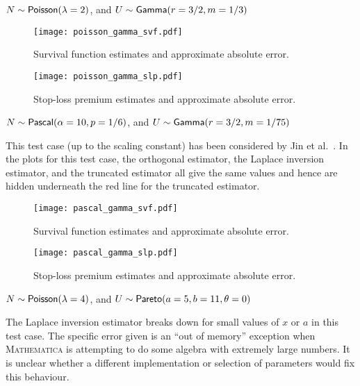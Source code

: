 
\begin{test}
$N\sim\mathsf{Poisson}(\lambda=2)$, and $U\sim\mathsf{Gamma}(r=3/2,m=1/3)$
\end{test}

\begin{figure}[H]
\centering
\texttt{[image: poisson\_gamma\_svf.pdf]}
\caption{Survival function estimates and approximate absolute error.}
\end{figure}

\begin{figure}[H]
\centering
\texttt{[image: poisson\_gamma\_slp.pdf]}
\caption{Stop-loss premium estimates and approximate absolute error.}
\end{figure}


\begin{test}
$N\sim\mathsf{Pascal}(\alpha=10,p=1/6)$, and $U\sim\mathsf{Gamma}(r=3/2,m=1/75)$
\end{test}

This test case (up to the scaling constant) has been considered by Jin et al.\ \cite[Example 3]{JiPrRe16}. In the plots for this test case, the orthogonal estimator, the Laplace inversion estimator, and the truncated estimator all give the same values and hence are hidden underneath the red line for the truncated estimator.

\begin{figure}[H]
\centering
\texttt{[image: pascal\_gamma\_svf.pdf]}
\caption{Survival function estimates and approximate absolute error.}
\end{figure}

\begin{figure}[H]
\centering
\texttt{[image: pascal\_gamma\_slp.pdf]}
\caption{Stop-loss premium estimates and approximate absolute error.}
\end{figure}

\begin{test} \label{test:poiss_pareto} $N\sim\mathsf{Poisson}(\lambda=4)$, and $U\sim\mathsf{Pareto}(a=5,b=11,\theta=0)$
\end{test}
The Laplace inversion estimator breaks down for small values of $x$ or $a$ in this test case. The specific error given is an ``out of memory'' exception when \textsc{Mathematica} is attempting to do some algebra with extremely large numbers. It is unclear whether a different implementation or selection of parameters would fix this behaviour.

